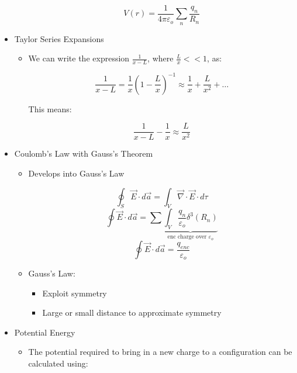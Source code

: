 \begin{itemize}
\begin{itemize}
        $$V(r)=\frac{1}{4\pi\varepsilon_o}\sum_n\frac{q_n}{R_n}$$

    \end{itemize}

  \item Taylor Series Expansions

    \begin{itemize}

      \item We can write the expression $\frac{1}{x-L}$, where $\frac{L}{x}<<1$, as:

        $$\frac{1}{x-L}=\frac{1}{x}\left( 1-\frac{L}{x} \right)^{-1}\approx\frac{1}{x}+\frac{L}{x^2}+\ldots$$

        This means:

        $$\frac{1}{x-L}-\frac{1}{x}\approx\frac{L}{x^2}$$

    \end{itemize}

  \item Coulomb's Law with Gauss's Theorem

    \begin{itemize}

      \item Develops into Gauss's Law


        $$\oint_S\vec{E}\cdot d\vec{a}=\int_V\vec{\nabla}\cdot\vec{E}\cdot d\tau$$
        $$\oint\vec{E}\cdot d\vec{a}=\sum\underbrace{\int_V \frac{q_n}{\varepsilon_o}\delta^3(R_n)}_{\text{enc charge over $\varepsilon_o$}}$$
        $$\oint\vec{E}\cdot d\vec{a}=\frac{q_{enc}}{\varepsilon_o}$$

      \item Gauss's Law:

        \begin{itemize}

          \item Exploit symmetry

          \item Large or small distance to approximate symmetry
            
        \end{itemize}

    \end{itemize}

  \item Potential Energy

    \begin{itemize}

      \item The potential required to bring in a new charge to a configuration can be calculated using:


\end{itemize}
\end{itemize}
